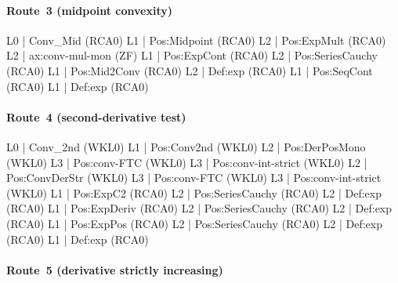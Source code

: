 \documentclass[11pt,reqno]{amsart}
\theoremstyle{redplain}
\numberwithin{equation}{section}
\begin{document}
\paragraph{Route~3 (midpoint convexity)}

\begin{verbatimbox}
	L0 | Conv_Mid                           (RCA0)
	L1 |   Pos:Midpoint                     (RCA0)
	L2 |     Pos:ExpMult                    (RCA0)
	L2 |     ax:conv-mul-mon                (ZF)
	L1 |   Pos:ExpCont                      (RCA0)
	L2 |     Pos:SeriesCauchy               (RCA0)
	L1 |   Pos:Mid2Conv                     (RCA0)
	L2 |     Def:exp                        (RCA0)
	L1 |   Pos:SeqCont                      (RCA0)
	L1 |   Def:exp                          (RCA0)
\end{verbatimbox}

\paragraph{Route~4 (second-derivative test)}

\begin{verbatimbox}
	L0 | Conv_2nd                           (WKL0)
	L1 |   Pos:Conv2nd                      (WKL0)
	L2 |     Pos:DerPosMono                 (WKL0)
	L3 |       Pos:conv-FTC                 (WKL0)
	L3 |       Pos:conv-int-strict          (WKL0)
	L2 |     Pos:ConvDerStr                 (WKL0)
	L3 |       Pos:conv-FTC                 (WKL0)
	L3 |       Pos:conv-int-strict          (WKL0)
	L1 |   Pos:ExpC2                        (RCA0)
	L2 |     Pos:SeriesCauchy               (RCA0)
	L2 |     Def:exp                        (RCA0)
	L1 |   Pos:ExpDeriv                     (RCA0)
	L2 |     Pos:SeriesCauchy               (RCA0)
	L2 |     Def:exp                        (RCA0)
	L1 |   Pos:ExpPos                       (RCA0)
	L2 |     Pos:SeriesCauchy               (RCA0)
	L2 |     Def:exp                        (RCA0)
	L1 |   Def:exp                          (RCA0)
\end{verbatimbox}

\paragraph{Route~5 (derivative strictly increasing)}
\end{document}

